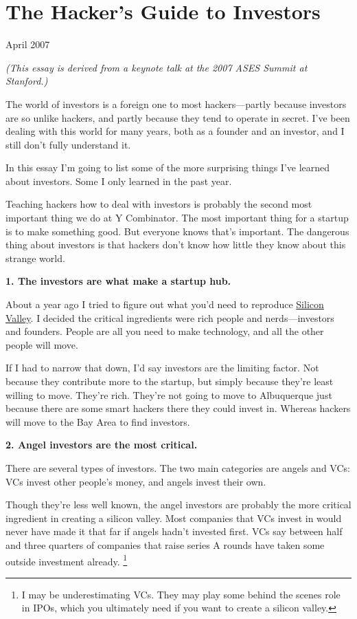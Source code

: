 \chapter{The Hacker's Guide to Investors}

April 2007

\emph{(This essay is derived from a keynote talk at the 2007 ASES Summit
at Stanford.)}

The world of investors is a foreign one to most hackers---partly because
investors are so unlike hackers, and partly because they tend to operate
in secret. I've been dealing with this world for many years, both as a
founder and an investor, and I still don't fully understand it.

In this essay I'm going to list some of the more surprising things I've
learned about investors. Some I only learned in the past year.

Teaching hackers how to deal with investors is probably the second most
important thing we do at Y Combinator. The most important thing for a
startup is to make something good. But everyone knows that's important.
The dangerous thing about investors is that hackers don't know how
little they know about this strange world.

\textbf{1. The investors are what make a startup hub.}

About a year ago I tried to figure out what you'd need to reproduce
\href{siliconvalley.html}{Silicon Valley}. I decided the critical
ingredients were rich people and nerds---investors and founders. People
are all you need to make technology, and all the other people will move.

If I had to narrow that down, I'd say investors are the limiting factor.
Not because they contribute more to the startup, but simply because
they're least willing to move. They're rich. They're not going to move
to Albuquerque just because there are some smart hackers there they
could invest in. Whereas hackers will move to the Bay Area to find
investors.

\textbf{2. Angel investors are the most critical.}

There are several types of investors. The two main categories are angels
and VCs: VCs invest other people's money, and angels invest their own.

Though they're less well known, the angel investors are probably the
more critical ingredient in creating a silicon valley. Most companies
that VCs invest in would never have made it that far if angels hadn't
invested first. VCs say between half and three quarters of companies
that raise series A rounds have taken some outside investment already.
\footnote{I may be underestimating VCs. They may play some behind the
scenes role in IPOs, which you ultimately need if you want to create a
silicon valley.}

